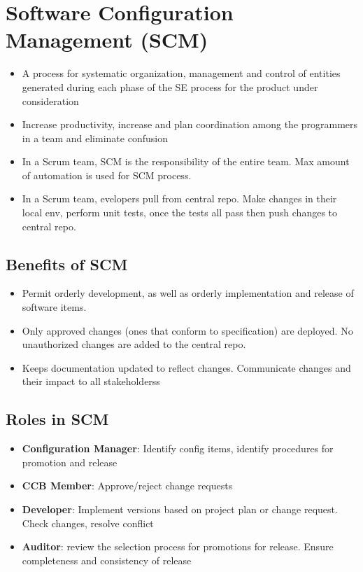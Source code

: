 \documentclass{article}
\begin{document}
\section{Software Configuration Management (SCM)}
\begin{itemize}
    \item A process for systematic organization, management and control of entities generated during each phase of the SE process for the product under consideration
    
    \item Increase productivity, increase and plan coordination among the programmers in a team and eliminate confusion
    
    \item In a Scrum team, SCM is the responsibility of the entire team. Max amount of automation is used for SCM process. 
    
    \item In a Scrum team, evelopers pull from central repo. Make changes in their local env, perform unit tests, once the tests all pass then push changes to central repo. 
\end{itemize}

\subsection{Benefits of SCM}
\begin{itemize}
    \item Permit orderly development, as well as orderly implementation and release of software items. 
    
    \item Only approved changes (ones that conform to specification) are deployed. No unauthorized changes are added to the central repo. 
    
    \item Keeps documentation updated to reflect changes. Communicate changes and their impact to all stakeholderss
\end{itemize}

\subsection{Roles in SCM}
\begin{itemize}
    \item \textbf{Configuration Manager}: Identify config items, identify procedures for promotion and release
    
    \item \textbf{CCB Member}: Approve/reject change requests
    
    \item \textbf{Developer}: Implement versions based on project plan or change request. Check changes, resolve conflict
    
    \item \textbf{Auditor}: review the selection process for promotions for release. Ensure completeness and consistency of release
\end{itemize}
\end{document}
